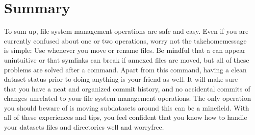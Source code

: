 \section{Summary}
\label{\detokenize{basics/101-136-filesystem:summary}}
\sphinxAtStartPar
To sum up, file system management operations are safe and easy.
Even if you are currently confused about one or two operations,
worry not \textendash{} the take\sphinxhyphen{}home\sphinxhyphen{}message is simple: Use 
whenever you move or rename files. Be mindful that a 
can appear unintuitive or that symlinks can break if annexed files are moved,
but all of these problems are solved after a  command.
Apart from this command, having a clean dataset status prior to doing anything
is your friend as well. It will make sure that you have a neat and organized
commit history, and no accidental commits of changes unrelated to your file
system management operations. The only operation you should beware of is
moving subdatasets around \textendash{} this can be a minefield.
With all of these experiences and tips, you feel confident that you know
how to handle your datasets files and directories well and worry\sphinxhyphen{}free.

\sphinxstepscope


